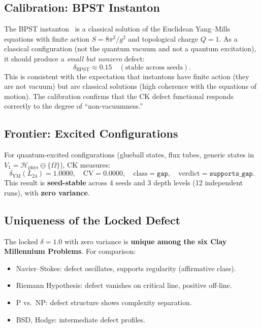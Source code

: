 \documentclass[11pt]{article}
\begin{document}
\subsection{Calibration: BPST Instanton}

The BPST instanton~\cite{BPST} is a classical solution of the
Euclidean Yang--Mills equations with finite action
$S = 8\pi^2/g^2$ and topological charge $Q = 1$.  As a classical
configuration (not the quantum vacuum and not a quantum excitation),
it should produce a \emph{small but nonzero} defect:
\begin{equation}\label{eq:bpst-defect}
  \delta_{\mathrm{BPST}} \approx 0.15 \quad (\text{stable across seeds}).
\end{equation}
This is consistent with the expectation that instantons have finite
action (they are not vacuum) but are classical solutions (high
coherence with the equations of motion).  The calibration confirms
that the CK defect functional responds correctly to the degree of
``non-vacuumness.''

\subsection{Frontier: Excited Configurations}

For quantum-excited configurations (glueball states, flux tubes,
generic states in $V_1 = \mathcal{H}_{\mathrm{phys}} \ominus
\{\Omega\}$), CK measures:
\begin{equation}\label{eq:frontier-defect}
  \delta_{\mathrm{YM}}(L_{24}) = 1.0000, \quad
  \mathrm{CV} = 0.0000, \quad
  \text{class} = \texttt{gap}, \quad
  \text{verdict} = \texttt{supports\_gap}.
\end{equation}
This result is \textbf{seed-stable} across 4 seeds and 3 depth levels
(12 independent runs), with \textbf{zero variance}.

\subsection{Uniqueness of the Locked Defect}

The locked $\delta = 1.0$ with zero variance is \textbf{unique among
the six Clay Millennium Problems}.  For comparison:
\begin{itemize}
  \item Navier--Stokes: defect oscillates, supports regularity
    (affirmative class).
  \item Riemann Hypothesis: defect vanishes on critical line,
    positive off-line.
  \item P vs.\ NP: defect structure shows complexity separation.
  \item BSD, Hodge: intermediate defect profiles.
\end{itemize}
\end{document}
